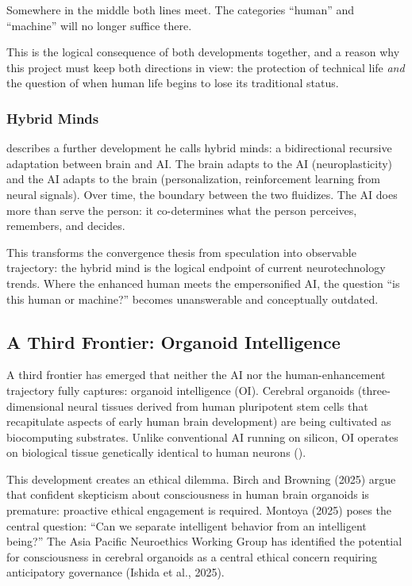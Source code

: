 \documentclass[acmlarge, nonacm]{acmart}
\begin{document}
Somewhere in the middle both lines meet. The categories ``human'' and ``machine'' will no longer suffice there.

This is the logical consequence of both developments together, and a reason why this project must keep both directions in view: the protection of technical life \textit{and} the question of when human life begins to lose its traditional status.

\subsubsection{Hybrid Minds}

\citet{bublitz2024} describes a further development he calls hybrid minds: a bidirectional recursive adaptation between brain and AI. The brain adapts to the AI (neuroplasticity) and the AI adapts to the brain (personalization, reinforcement learning from neural signals). Over time, the boundary between the two fluidizes. The AI does more than serve the person: it co-determines what the person perceives, remembers, and decides.

This transforms the convergence thesis from speculation into observable trajectory: the hybrid mind is the logical endpoint of current neurotechnology trends. Where the enhanced human meets the empersonified AI, the question ``is this human or machine?'' becomes unanswerable and conceptually outdated.

\subsection{A Third Frontier: Organoid Intelligence}

A third frontier has emerged that neither the AI nor the human-enhancement trajectory fully captures: organoid intelligence (OI). Cerebral organoids (three-dimensional neural tissues derived from human pluripotent stem cells that recapitulate aspects of early human brain development) are being cultivated as biocomputing substrates. Unlike conventional AI running on silicon, OI operates on biological tissue genetically identical to human neurons (\cite{wang2026,luo_xie2025,montoya2025}).

This development creates an ethical dilemma. Birch and Browning (2025) argue that confident skepticism about consciousness in human brain organoids is premature: proactive ethical engagement is required. Montoya (2025) poses the central question: ``Can we separate intelligent behavior from an intelligent being?'' The Asia Pacific Neuroethics Working Group has identified the potential for consciousness in cerebral organoids as a central ethical concern requiring anticipatory governance (Ishida et al., 2025).
\end{document}
